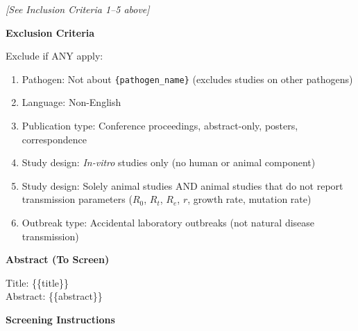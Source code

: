 \begin{tcolorbox}
\begin{tcolorbox}[
    enhanced,
    colback=gray!5,
    colframe=gray!20,
    boxrule=0pt,
    leftrule=3pt,
    arc=0pt,
    left=6pt, right=6pt, top=4pt, bottom=4pt
]
\begin{tcolorbox}[
    enhanced,
    colback=green!5,
    colframe=green!20,
    boxrule=0pt,
    leftrule=3pt,
    arc=0pt,
    left=6pt, right=6pt, top=4pt, bottom=4pt
]
\vspace{2pt}
{\small\textit{[See Inclusion Criteria 1--5 above]}}
\end{tcolorbox}

\begin{tcolorbox}[
    enhanced,
    colback=red!5,
    colframe=red!20,
    boxrule=0pt,
    leftrule=3pt,
    arc=0pt,
    left=6pt, right=6pt, top=4pt, bottom=4pt
]
{\small\textbf{\textcolor{red!60!black}{Exclusion Criteria}}}

\vspace{2pt}
{\small
{Exclude if ANY apply:}
\begin{enumerate}
    [leftmargin=*, itemsep=0pt, topsep=4pt]
    \item Pathogen: Not about \texttt{\{pathogen\_name\}} (excludes studies on other pathogens)
    \item Language: Non-English
    \item Publication type: Conference proceedings, abstract-only, posters, correspondence
    \item Study design: \textit{In-vitro} studies only (no human or animal component)
    \item Study design: Solely animal studies AND animal studies that do not report transmission parameters ($R_0$, $R_t$, $R_e$, $r$, growth rate, mutation rate)
    \item {Outbreak type:} Accidental laboratory outbreaks (not natural disease transmission)
\end{enumerate}
}
\end{tcolorbox}

\end{tcolorbox}

\begin{tcolorbox}[
    enhanced,
    colback=gray!5,
    colframe=gray!20,
    boxrule=0pt,
    leftrule=3pt,
    arc=0pt,
    left=6pt, right=6pt, top=4pt, bottom=4pt
]
{\small\textbf{\textcolor{gray!70!black}{Abstract (To Screen)}}}

\vspace{4pt}
{\small\ttfamily
Title: \{\{title\}\}\\[2pt]
Abstract: \{\{abstract\}\}
}
\end{tcolorbox}

\begin{tcolorbox}[
    enhanced,
    colback=gray!5,
    colframe=gray!20,
    boxrule=0pt,
    leftrule=3pt,
    arc=0pt,
    left=6pt, right=6pt, top=4pt, bottom=4pt
]
{\small\textbf{\textcolor{gray!70!black}{Screening Instructions}}}


\end{tcolorbox}
\end{tcolorbox}

